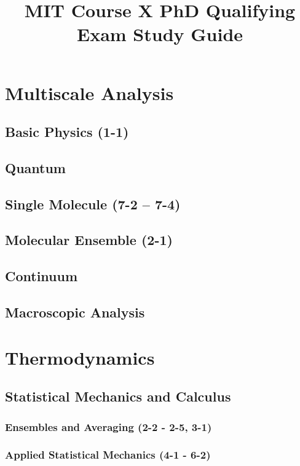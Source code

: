 \documentclass{mitqualif}
\title{MIT Course X PhD Qualifying Exam Study Guide}
\begin{document}
\mytitlepage %
\newpage

\tableofcontents
\newpage


\chapter{Multiscale Analysis}
\section{Basic Physics (1-1)}

\section{Quantum}
\section{Single Molecule (7-2 -- 7-4)}
%


%


\section{Molecular Ensemble (2-1)}

\section{Continuum}
\section{Macroscopic Analysis}
\newpage
\chapter{Thermodynamics}
\section{Statistical Mechanics and Calculus}
\subsection{Ensembles and Averaging (2-2 - 2-5, 3-1)}




\subsection{Applied Statistical Mechanics (4-1 - 6-2)}


\end{document}
